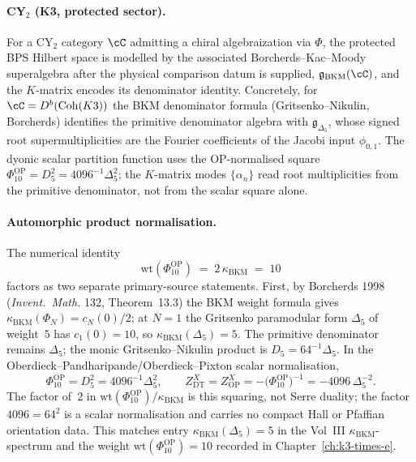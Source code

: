 \begin{remark}
\paragraph{CY\texorpdfstring{$_2$}{-2} (K3, protected sector).} For a CY$_2$ category $\cC$ admitting a
chiral algebraization via $\Phi$, the protected BPS Hilbert space is
modelled by the associated Borcherds--Kac--Moody superalgebra after the
physical comparison datum is supplied,
$\mathfrak{g}_{\mathrm{BKM}}(\cC)$, and the $K$-matrix encodes its
denominator identity. Concretely, for $\cC = D^b(\mathrm{Coh}(K3))$ the
BKM denominator formula (Gritsenko--Nikulin, Borcherds) identifies the
primitive denominator algebra with \(\mathfrak g_{\Delta_5}\), whose
signed root supermultiplicities are the Fourier coefficients of the
Jacobi input \(\phi_{0,1}\). The dyonic scalar partition function uses
the OP-normalised square
\(\Phi_{10}^{\mathrm{OP}}=D_5^2=4096^{-1}\Delta_5^2\); the
\(K\)-matrix modes \(\{\alpha_n\}\) read root multiplicities from the
primitive denominator, not from the scalar square alone.

\paragraph{Automorphic product normalisation.} The numerical identity
\[
 \mathrm{wt}(\Phi_{10}^{\mathrm{OP}}) \;=\; 2\,\kappa_{\mathrm{BKM}}
 \;=\; 10
\]
factors as two separate primary-source statements. First, by Borcherds
1998 (\emph{Invent.\ Math.} 132, Theorem~13.3) the BKM weight formula
gives $\kappa_{\mathrm{BKM}}(\Phi_N) = c_N(0)/2$; at $N=1$ the
Gritsenko paramodular form $\Delta_5$ of weight~$5$ has $c_1(0) = 10$,
so $\kappa_{\mathrm{BKM}}(\Delta_5) = 5$. The primitive denominator remains
$\Delta_5$; the monic Gritsenko--Nikulin product is
$D_5=64^{-1}\Delta_5$. In the Oberdieck--Pandharipande/Oberdieck--Pixton
scalar normalisation,
\[
 \Phi_{10}^{\mathrm{OP}}
 = D_5^2
 = 4096^{-1}\Delta_5^2,
 \qquad
 Z^{X}_{\mathrm{DT}}=Z^{X}_{\mathrm{OP}}
 =-\bigl(\Phi_{10}^{\mathrm{OP}}\bigr)^{-1}
 =-4096\,\Delta_5^{-2}.
\]
The factor of~$2$ in
$\mathrm{wt}(\Phi_{10}^{\mathrm{OP}})/\kappa_{\mathrm{BKM}}$ is this
squaring, not Serre duality; the factor $4096=64^2$ is a scalar
normalisation and carries no compact Hall or Pfaffian orientation data.
This matches entry $\kappa_{\mathrm{BKM}}(\Delta_5)=5$ in the
Vol~III $\kappa_{\mathrm{BKM}}$-spectrum and the weight
$\mathrm{wt}(\Phi_{10}^{\mathrm{OP}})=10$ recorded in
Chapter~\ref{ch:k3-times-e}.


\end{remark}
